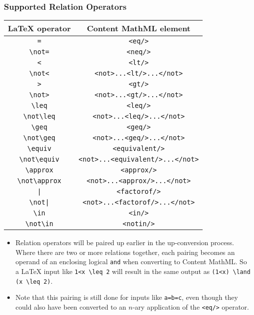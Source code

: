 \subsubsection*{Supported Relation Operators}

\begin{tabular}{|c|c|}
\hline
LaTeX operator & Content MathML element \\
\hline
\verb|=| & \verb|<eq/>| \\
\verb|\not=| & \verb|<neq/>| \\
\verb|<| & \verb|<lt/>| \\
\verb|\not<| & \verb|<not>...<lt/>...</not>| \\
\verb|>| & \verb|<gt/>| \\
\verb|\not>| & \verb|<not>...<gt/>...</not>| \\
\verb|\leq| & \verb|<leq/>| \\
\verb|\not\leq| & \verb|<not>...<leq/>...</not>| \\
\verb|\geq| & \verb|<geq/>| \\
\verb|\not\geq| & \verb|<not>...<geq/>...</not>| \\
\verb|\equiv| & \verb|<equivalent/>| \\
\verb|\not\equiv| & \verb|<not>...<equivalent/>...</not>| \\
\verb|\approx| & \verb|<approx/>| \\
\verb|\not\approx| & \verb|<not>...<approx/>...</not>| \\
\verb.|. & \verb|<factorof/>| \\
\verb.\not|. & \verb|<not>...<factorof/>...</not>| \\
\verb|\in| & \verb|<in/>| \\
\verb|\not\in| & \verb|<notin/>| \\
\hline
\end{tabular}

\begin{itemize}
\item
  Relation operators will be paired up earlier in the up-conversion
  process. Where there are two or more relations together, each pairing
  becomes an operand of an enclosing logical \verb|and| when
  converting to Content MathML. So a LaTeX input like \verb|1<x \leq 2| will
  result in the same output as \verb|(1<x) \land (x \leq 2)|.

\item
  Note that this pairing is still done for inputs like \verb|a=b=c|,
  even though they could also have been converted to an $n$-ary application of
  the \verb|<eq/>| operator.
\end{itemize}

